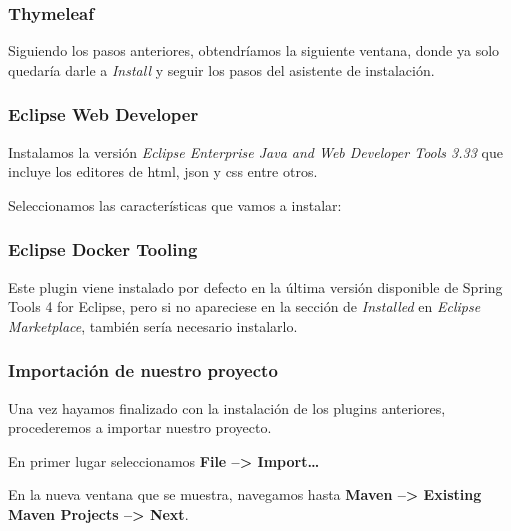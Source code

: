 \subsubsection{Thymeleaf}

Siguiendo los pasos anteriores, obtendríamos la siguiente ventana, donde ya solo quedaría darle a \textit{Install} y seguir los pasos del asistente de instalación.

\subsubsection{Eclipse Web Developer}

Instalamos la versión \textit{Eclipse Enterprise Java and Web Developer Tools 3.33} que incluye los editores de html, json y css entre otros.

Seleccionamos las características que vamos a instalar:


\subsubsection{Eclipse Docker Tooling}

Este plugin viene instalado por defecto en la última versión disponible de Spring Tools 4 for Eclipse, pero si no apareciese en la sección de \textit{Installed} en \textit{Eclipse Marketplace}, también sería necesario instalarlo.



\subsubsection{Importación de nuestro proyecto}

Una vez hayamos finalizado con la instalación de los plugins anteriores, procederemos a importar nuestro proyecto.

En primer lugar seleccionamos \textbf{File --> Import\dots}


En la nueva ventana que se muestra, navegamos hasta \textbf{Maven --> Existing Maven Projects --> Next}.

